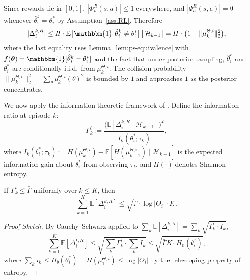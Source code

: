 Since rewards lie in $[0, 1]$, $|\Phi_h^R(s, a)| \leq 1$ everywhere, and $|\Phi_h^R(s, a)| = 0$ whenever $\hat{\theta}_i^k = \theta_i^*$ by Assumption~\ref{ass:RL}. Therefore
\begin{equation}
|\Delta_i^{k,R}| \leq H \cdot \mathbb{E}\big[\mathbbm{1}\big[\hat{\theta}_i^k \neq \theta_i^*\big] \,\big|\, \mathcal{H}_{k-1}\big] = H \cdot \big(1 - \|\mu_k^{\Theta,i}\|_2^2\big),
\end{equation}
where the last equality uses Lemma~\ref{lem:ps-equivalence} with $f(\boldsymbol{\theta}) = \mathbbm{1}[\hat{\theta}_i^k = \theta_i^*]$ and the fact that under posterior sampling, $\hat{\theta}_i^k$ and $\theta_i^*$ are conditionally i.i.d.\ from $\mu_k^{\Theta,i}$. The collision probability $\|\mu_k^{\Theta,i}\|_2^2 = \sum_\theta \mu_k^{\Theta,i}(\theta)^2$ is bounded by $1$ and approaches $1$ as the posterior concentrates.

We now apply the information-theoretic framework of \citet{russo2016information}. Define the information ratio at episode $k$:
\begin{equation}
\Gamma_k^i := \frac{\big(\mathbb{E}[\Delta_i^{k,R} \mid \mathcal{H}_{k-1}]\big)^2}{I_k(\theta_i^*; \tau_k)},
\end{equation}
where $I_k(\theta_i^*; \tau_k) := H(\mu_k^{\Theta,i}) - \mathbb{E}[H(\mu_{k+1}^{\Theta,i}) \mid \mathcal{H}_{k-1}]$ is the expected information gain about $\theta_i^*$ from observing $\tau_k$, and $H(\cdot)$ denotes Shannon entropy.

\begin{proposition}
\label{prop:type-bound}
If $\Gamma_k^i \leq \bar{\Gamma}$ uniformly over $k \leq K$, then
\begin{equation}
\label{eq:type-bound}
\sum_{k=1}^K \mathbb{E}[\Delta_i^{k,R}] \leq \sqrt{\bar{\Gamma} \cdot \log|\Theta_i| \cdot K}.
\end{equation}
\end{proposition}

\begin{proof}[Proof Sketch]
By Cauchy--Schwarz applied to $\sum_k \mathbb{E}[\Delta_i^{k,R}] = \sum_k \sqrt{\Gamma_k^i \cdot I_k}$,
\begin{equation}
\sum_{k=1}^K \mathbb{E}[\Delta_i^{k,R}] \leq \sqrt{\sum_k \Gamma_k^i \cdot \sum_k I_k} \leq \sqrt{\bar{\Gamma} K \cdot H_0(\theta_i^*)},
\end{equation}
where $\sum_k I_k \leq H_0(\theta_i^*) = H(\mu_1^{\Theta,i}) \leq \log|\Theta_i|$ by the telescoping property of entropy.
\end{proof}

